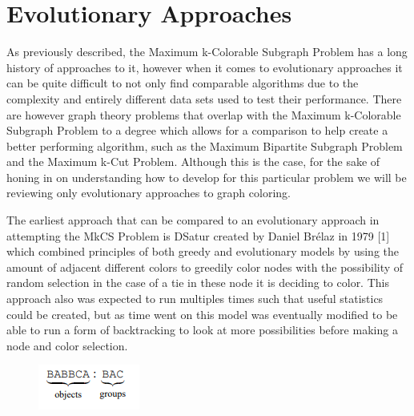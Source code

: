 \documentclass{article}
\begin{document}
 \section{Evolutionary Approaches}
  \hspace{\parindent} As previously described, the Maximum k-Colorable Subgraph Problem has a long history of approaches to it, however when it comes to evolutionary approaches it can be quite difficult to not only find comparable algorithms due to the complexity and entirely different data sets used to test their performance. There are however graph theory problems that overlap with the Maximum k-Colorable Subgraph Problem to a degree which allows for a comparison to help create a better performing algorithm, such as the Maximum Bipartite Subgraph Problem and the Maximum k-Cut Problem. Although this is the case, for the sake of honing in on understanding how to develop for this particular problem we will be reviewing only evolutionary approaches to graph coloring.
  \par The earliest approach that can be compared to an evolutionary approach in attempting the MkCS Problem is DSatur created by Daniel Brélaz in 1979 [1] which combined principles of both greedy and evolutionary models by using the amount of adjacent different colors to greedily color nodes with the possibility of random selection in the case of a tie in these node it is deciding to color. This approach also was expected to run multiples times such that useful statistics could be created, but as time went on this model was eventually modified to be able to run a form of backtracking to look at more possibilities before making a node and color selection.
   \begin{figure}
    \centering
    \caption{}
    \includegraphics[scale=1.2]{ex1.png}
   \end{figure}
\end{document}
